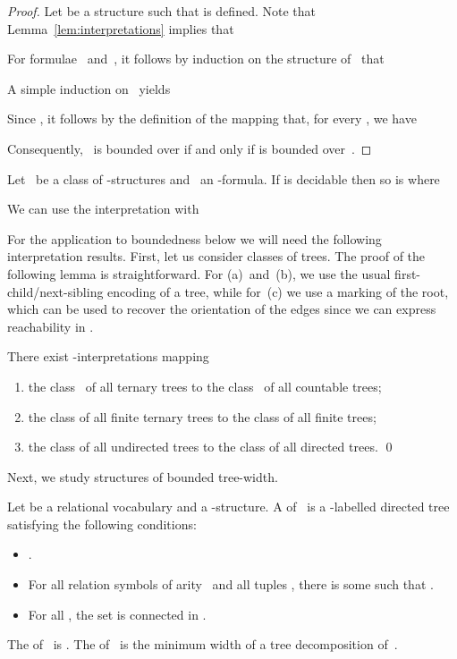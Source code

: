 \documentclass{LMCS}
\begin{document}
\begin{thm}
\begin{proof}
Let  be a structure such that  is defined.
Note that Lemma~\ref{lem:interpretations} implies that

For formulae ~and~, it follows by induction on the structure of~ that

A simple induction on~ yields

Since , it follows by the definition of the mapping 
that, for every , we have

Consequently, ~is bounded over 
if and only if  is bounded over~.
\end{proof}

\begin{cor}\label{cor:decidability and subclasses}
Let ~be a class of -structures and ~an -formula.
If\/  is decidable then so is
 where

\end{cor}
\proof
We can use the interpretation 
with



For the application to boundedness below we will need the following
interpretation results. First, let us consider classes of trees.
The proof of the following lemma is straightforward.
For (a)~and~(b), we use the usual first-child/next-sibling encoding of a tree,
while for~(c) we use a marking of the root, which can be used to recover the
orientation of the edges since we can express reachability in .
\begin{lem}\label{lem: tree interpretations}
There exist -interpretations mapping
\begin{enumerate}
\item the class~ of all ternary trees to the class~ of all countable trees\?;
\item the class of all finite ternary trees to the class of all finite trees\?;
\item the class of all undirected trees to the class of all directed trees.
\qed\end{enumerate}
\end{lem}

Next, we study structures of bounded tree-width.
\begin{defi}
Let  be a relational vocabulary and  a -structure.
A  of~
is a -labelled directed tree 
satisfying the following conditions\?:
\begin{itemize}
\item .
\item For all relation symbols  of arity~ and all tuples
  ,
  there is some  such that .
\item For all ,
  the set 
  is connected in .
\end{itemize}
The  of~ is .
The  of~ is the minimum width
of a tree decomposition of~.
\end{defi}


\end{thm}
\end{document}
